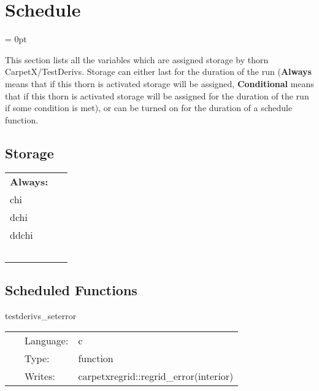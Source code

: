 
\section{Schedule} 


\parskip = 0pt


\noindent This section lists all the variables which are assigned storage by thorn CarpetX/TestDerivs.  Storage can either last for the duration of the run ({\bf Always} means that if this thorn is activated storage will be assigned, {\bf Conditional} means that if this thorn is activated storage will be assigned for the duration of the run if some condition is met), or can be turned on for the duration of a schedule function.


\subsection*{Storage}

\hspace{5mm}

 \begin{tabular*}{160mm}{ll} 

{\bf Always:}&  ~ \\ 
 chi & ~\\ 
 dchi & ~\\ 
 ddchi & ~\\ 
~ & ~\\ 
\end{tabular*} 


\subsection*{Scheduled Functions}
\vspace{5mm}


\hspace{5mm} testderivs\_seterror 

\hspace{5mm}{\it set up test grid } 


\hspace{5mm}

 \begin{tabular*}{160mm}{cll} 
~ & Language:  & c \\ 
~ & Type:  & function \\ 
~ & Writes:  & carpetxregrid::regrid\_error(interior) \\ 
\end{tabular*} 


